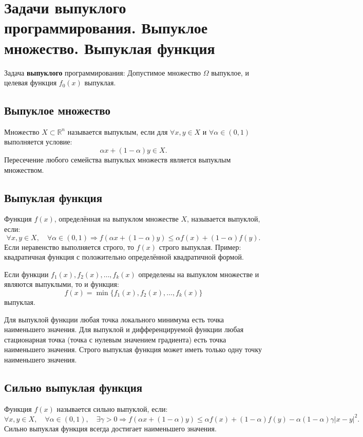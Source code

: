 \documentclass[17pt]{extarticle}
\begin{document}
\section{Задачи выпуклого программирования. Выпуклое множество. Выпуклая функция}

Задача \textbf{выпуклого} программирования:
Допустимое множество \( \Omega \) выпуклое, и целевая функция \( f_0(x) \) выпуклая.

\subsection{Выпуклое множество}
Множество \( X \subset \mathbb{R}^n \) называется выпуклым, если для \( \forall x, y \in X \) и \( \forall \alpha \in (0,1) \) выполняется условие:
\[
    \alpha x + (1 - \alpha) y \in X.
\]
Пересечение любого семейства выпуклых множеств является выпуклым множеством.

\subsection{Выпуклая функция}
Функция \( f(x) \), определённая на выпуклом множестве \( X \), называется выпуклой, если:
\[
    \forall x, y \in X, \quad \forall \alpha \in (0,1) \Rightarrow f(\alpha x + (1 - \alpha) y) \le \alpha f(x) + (1 - \alpha) f(y).
\]
Если неравенство выполняется строго, то \( f(x) \) строго выпуклая. Пример: квадратичная функция с положительно определённой квадратичной формой.

Если функции \( f_1(x), f_2(x), \dots, f_k(x) \) определены на выпуклом множестве и являются выпуклыми, то и функция:
\[
    f(x) = \min\{ f_1(x), f_2(x), \dots, f_k(x) \}
\]
выпуклая.

Для выпуклой функции любая точка локального минимума есть точка наименьшего значения. Для выпуклой и дифференцируемой функции любая стационарная точка (точка с нулевым значением градиента) есть точка наименьшего значения. Строго выпуклая функция может иметь только одну точку наименьшего значения.

\subsection{Сильно выпуклая функция}
Функция \( f(x) \) называется сильно выпуклой, если:
\[
    \forall x, y \in X, \quad \forall \alpha \in (0,1), \quad \exists \gamma > 0 \Rightarrow
    f(\alpha x + (1 - \alpha) y) \le \alpha f(x) + (1 - \alpha) f(y) - \alpha(1-\alpha)\gamma|x-y|^2.
\]
Сильно выпуклая функция всегда достигает наименьшего значения.
\end{document}
